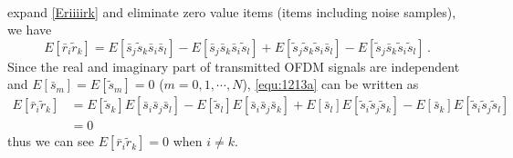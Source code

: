 \begin{equation}
\begin{split}
\end{split}
\label{Eriiiirk}
\end{equation}
expand \eqref{Eriiiirk} and eliminate zero value items (items including noise samples), we have 
 \begin{equation}
   E[\bar{r}_i\tilde{r}_k] = E[\bar{s}_j\tilde{s}_k\bar{s}_i\bar{s}_l] -  E[\bar{s}_j\bar{s}_k\bar{s}_i\tilde{s}_l] + E[\tilde{s}_j\tilde{s}_k\tilde{s}_i\bar{s}_l] - E[\tilde{s}_j\bar{s}_k\tilde{s}_i\tilde{s}_l]\,.
   \label{equ:1213a}
\end{equation}
Since the real and imaginary part of transmitted OFDM signals are independent and $E[\bar{s}_m] = E[\tilde{s}_m] = 0$ ($m = 0, 1, \cdots, N$), \eqref{equ:1213a} can be written as
\begin{equation}
  \begin{split}
  E[\bar{r}_i\tilde{r}_k] &= E[\tilde{s}_k]E[\bar{s}_i\bar{s}_j\bar{s}_l]  - E[\tilde{s}_l]E[\bar{s}_i\bar{s}_j\bar{s}_k] + E[\bar{s}_l]E[\tilde{s}_i\tilde{s}_j\tilde{s}_k] -  E[\bar{s}_k]E[\tilde{s}_i\tilde{s}_j\tilde{s}_l]\\
  &= 0
\end{split}
  \label{equ:1215m}
\end{equation}
thus we can see $E[\bar{r}_i\tilde{r}_k] = 0$  when $i \neq k $.  

